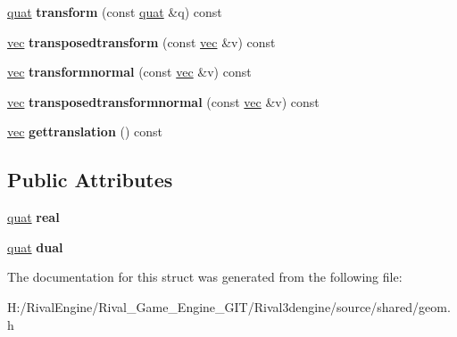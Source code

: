 \begin{DoxyCompactItemize}
\mbox{\label{structdualquat_af92ee93fce8635cf9bebd0aa1e80b45f}} 
\hyperlink{structquat}{quat} {\bfseries transform} (const \hyperlink{structquat}{quat} \&q) const
\item 
\mbox{\label{structdualquat_adf022059c82c8675ceca71359ca414f8}} 
\hyperlink{structvec}{vec} {\bfseries transposedtransform} (const \hyperlink{structvec}{vec} \&v) const
\item 
\mbox{\label{structdualquat_a0c895860a49ba224327bcd88040a14ec}} 
\hyperlink{structvec}{vec} {\bfseries transformnormal} (const \hyperlink{structvec}{vec} \&v) const
\item 
\mbox{\label{structdualquat_a85b57d72c8a78a2fa2fc2e284bb05071}} 
\hyperlink{structvec}{vec} {\bfseries transposedtransformnormal} (const \hyperlink{structvec}{vec} \&v) const
\item 
\mbox{\label{structdualquat_ab70c5b3e4d651a632482b6abff6c0f18}} 
\hyperlink{structvec}{vec} {\bfseries gettranslation} () const
\end{DoxyCompactItemize}
\subsection*{Public Attributes}
\begin{DoxyCompactItemize}
\item 
\mbox{\label{structdualquat_a34cfd1d698c9a8e964565e3bceffbeae}} 
\hyperlink{structquat}{quat} {\bfseries real}
\item 
\mbox{\label{structdualquat_a804e351db2ac4c438b7d3d16462b950b}} 
\hyperlink{structquat}{quat} {\bfseries dual}
\end{DoxyCompactItemize}


The documentation for this struct was generated from the following file\+:\begin{DoxyCompactItemize}
\item 
H\+:/\+Rival\+Engine/\+Rival\+\_\+\+Game\+\_\+\+Engine\+\_\+\+G\+I\+T/\+Rival3dengine/source/shared/geom.\+h\end{DoxyCompactItemize}
